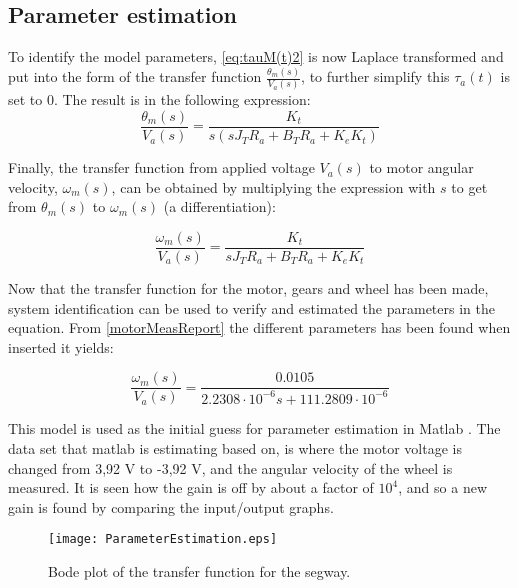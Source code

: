 \subsection{Parameter estimation}

To identify the model parameters, \autoref{eq:tauM(t)2} is now Laplace transformed and put into the form of the transfer function $\frac{\theta_m(s)}{V_a(s)}$, to further simplify this $\tau_a(t)$ is set to 0. The result is in the following expression:
\begin{equation}
\frac{\theta_m(s)}{V_a(s)} = \frac{K_t}{s\left( s J_T R_a + B_T R_a + K_e K_t \right)}
\end{equation}

Finally, the transfer function from applied voltage $V_a(s)$ to motor angular velocity, $\omega_m(s)$, can be obtained by multiplying the expression with $s$ to get from $\theta_m(s)$ to $\omega_m(s)$ (a differentiation):

\begin{equation}
\frac{\omega_m(s)}{V_a(s)} = \frac{K_t}{s J_T R_a + B_T R_a + K_e K_t}
\label{TFGear}
\end{equation}

Now that the transfer function for the motor, gears and wheel has been made, system identification can be used to verify and estimated the parameters in the equation. From \autoref{motorMeasReport} the different parameters has been found when inserted it yields:

\begin{equation}
\frac{\omega_m(s)}{V_a(s)} = \frac{0.0105}{2.2308\cdot10^{-6}s+111.2809\cdot10^{-6}}
\label{TFMotorNumbers}
\end{equation}

This model is used as the initial guess for parameter estimation in Matlab . The data set that matlab is estimating based on, is where the motor voltage is changed from 3,92 V to -3,92 V, and the angular velocity of the wheel is measured. It is seen how the gain is off by about a factor of $10^4$, and so a new gain is found by comparing the input/output graphs. %

\begin{figure}[H]
    \centering
    \texttt{[image: ParameterEstimation.eps]}
    \caption{Bode plot of the transfer function for the segway.}
    \label{fig:paramEst1}
\end{figure} 

